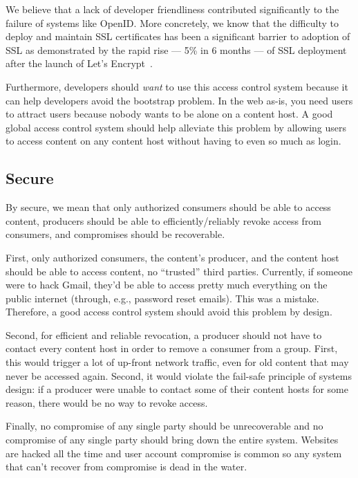 \documentclass[pdftex,12pt,a4papaer,twoside,notitlepage]{report}
\begin{document}
We believe that a lack of developer friendliness contributed significantly to
the failure of systems like OpenID\cite{openid}. More concretely, we know that
the difficulty to deploy and maintain SSL certificates has been a significant
barrier to adoption of SSL as demonstrated by the rapid rise --- 5\% in 6 months
--- of SSL deployment after the launch of Let's Encrypt~\cite{lets-encrypt}.

Furthermore, developers should \emph{want} to use this access control system
because it can help developers avoid the bootstrap problem. In the web as-is,
you need users to attract users because nobody wants to be alone on a content
host. A good global access control system should help alleviate this problem by
allowing users to access content on any content host without having to even so
much as login.


\subsection{Secure}

By secure, we mean that only authorized consumers should be able to access
content, producers should be able to efficiently/reliably revoke access from
consumers, and compromises should be recoverable.

First, only authorized consumers, the content's producer, and the content host
should be able to access content, no ``trusted'' third parties. Currently, if someone were
to hack Gmail, they'd be able to access pretty much everything on the public
internet (through, e.g., password reset emails). This was a mistake. Therefore,
a good access control system should avoid this problem by design.

Second, for efficient and reliable revocation, a producer should not have to
contact every content host in order to remove a consumer from a group. First,
this would trigger a lot of up-front network traffic, even for old content that
may never be accessed again. Second, it would violate the fail-safe principle of
systems design: if a producer were unable to contact some of their content hosts
for some reason, there would be no way to revoke access.

Finally, no compromise of any single party should be unrecoverable and no
compromise of any single party should bring down the entire system. Websites are
hacked all the time and user account compromise is common so any system that
can't recover from compromise is dead in the water.
\end{document}
